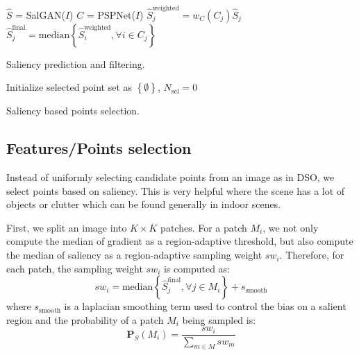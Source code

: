 \documentclass[letterpaper, 10 pt, conference]{ieeeconf}  %
\begin{document}
\begin{algorithm}[t!]
$\hat{S}$ = SalGAN($I$)\;
$C$ = PSPNet($I$)\;
 {
    $\hat{S}^{\text{weighted}}_{j} = w_{C}(C_{j})\hat{S}_{j}$\;
}
 {
    $\hat{S}^{\text{final}}_{j} = \text{median}\left \{ \hat{S}^{\text{weighted}}_{i}, \forall i \in C_{j} \right \}$\;
}
 \caption{Saliency prediction and filtering.}
 \label{alg:saliency}
\end{algorithm}


\begin{algorithm}[t!]
Initialize selected point set as $\left\{ \emptyset\right\}$, $N_{\text{sel}} = 0$\;
 \caption{Saliency based points selection.}
 \label{alg:selection}
\end{algorithm}

\subsection{Features/Points selection}
\label{sec:points}
Instead of uniformly selecting candidate points from an image as in DSO, we select points based on saliency. This is very helpful where the scene has a lot of objects or clutter which can be found generally in indoor scenes.

First, we split an image into $K \times K$ patches. For a patch $M_{i}$, we not only compute the median of gradient as a region-adaptive threshold, but also compute the median of saliency as a region-adaptive sampling weight $sw_{i}$. Therefore, for each patch, the sampling weight $sw_{i}$ is computed as:
\begin{equation}
    sw_{i} = \text{median}\left \{ \hat{S}^{\text{final}}_{j}, \forall j \in M_{i} \right \} + s_{\text{smooth}}
\end{equation}
where $s_{\text{smooth}}$ is a laplacian smoothing term used to control the bias on a salient region and the probability of a patch $M_{i}$ being sampled is:
\begin{equation}
    \boldsymbol{P}_{S}(M_{i}) = \frac{sw_{i}}{\sum_{m \in M} sw_{m}}
\end{equation}
\end{document}

